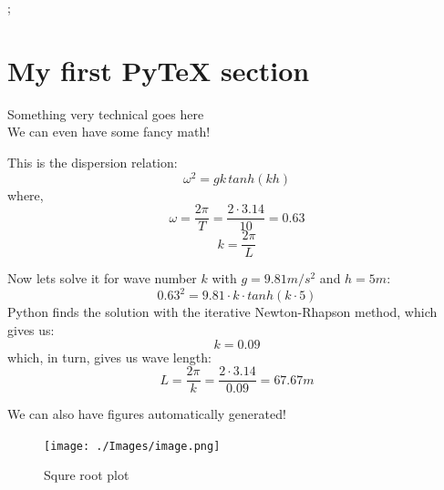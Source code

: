 \documentclass[12pt, letterpaper]{article}
\begin{document}
{ ;}
\cfoot{}
\pagebreak
\section{My first PyTeX section}
Something very technical goes here\\


We can even have some fancy math!

This is the dispersion relation:
$$\omega^2 = gk\, tanh(kh)$$
where,
$$\omega = \frac{2\pi}{T} = \frac{2\cdot 3.14}{10} = 0.63$$
$$k = \frac{2\pi}{L}$$

Now lets solve it for wave number $k$ with $g=9.81m/s^2$ and $h=5m$:
$$0.63^2=9.81\cdot k\cdot tanh(k\cdot 5)$$
Python finds the solution with the iterative Newton-Rhapson method, which gives us:
$$k = 0.09$$
which, in turn, gives us wave length:
$$L = \frac{2\pi}{k} = \frac{2\cdot 3.14}{0.09} = 67.67m$$

\pagebreak
We can also have figures automatically generated!
\begin{figure}[h]
	\centering
	\texttt{[image: ./Images/image.png]}
	\caption{Squre root plot}
\end{figure}
\end{document}
